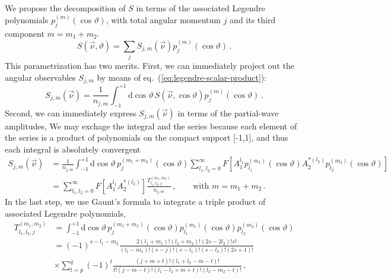 \documentclass[aps,prd,reprint,nofootinbib,preprintnumbers]{revtex4}
\newcommand{\rmdx}[1]{\mbox{d} #1 \,} %
\newcommand{\refeq}[1]{eq.~(\ref{eq:#1})}
\renewcommand{\theta}{\vartheta}
\newcommand{\fred}[1]{{\color{brown!85!black}#1}}
\begin{document}
We propose the decomposition of $S$ in terms of the associated Legendre polynomials $p_{j}^{(m)}(\cos\theta)$, with total angular momentum $j$ and its third component $m=m_1 + m_2$.
\begin{equation}
    S(\vec{\nu}, \theta) = \sum_j S_{j,m}(\vec{\nu}) p_{j}^{(m)}(\cos\theta)\,.
\end{equation}
This parametrization has two merits. First, we can immediately project out the angular observables $S_{j,m}$ by means of \refeq{legendre-scalar-product}:
\begin{equation}
    S_{j,m}(\vec{\nu}) = \frac{1}{n_{j,m}} \int_{-1}^{+1} \rmdx{\cos\theta} S(\vec{\nu},\cos \theta) p_{j}^{(m)}(\cos\theta)\,.
\end{equation}
Second, we can immediately express $S_{j,m}(\vec{\nu})$ in terms of
the partial-wave amplitudes, \fred{We may exchage the integral and the
  series because each element of the series is a product of
  polynomials on the compact support [-1,1], and thus each integral is
  absolutely convergent}
\begin{equation}
    \label{eq:partial-wave-observable-infinite}
    \begin{aligned}
        S_{j,m}(\vec{\nu})
            & = \frac{1}{n_{j,m}} \int_{-1}^{+1} \rmdx{\cos\theta} p_{j}^{(m_1 + m_2)}(\cos\theta) \sum_{l_1,l_2=0}^\infty F\left[A_{1}^{l_1} p_{l_1}^{(m_1)}(\cos\theta) A_{2}^{*(l_2)}p_{l_2}^{(m_2)}(\cos\theta)\right]\\
            & = \sum_{l_1,l_2=0}^\infty F\left[A_{1}^{l_1} A_{2}^{*(l_2)}\right] \frac{T_{l_1,l_2,j}^{(m_1,m_2)}}{n_{j,m}}\,,\qquad\text{with }m = m_1 + m_2\,.
    \end{aligned}
\end{equation}
In the last step, we use Gaunt's formula \cite{Gaunt:1929} to integrate a triple product of associated Legendre polynomials,
\begin{equation}
\begin{aligned}
    T_{l_1,l_2,j}^{(m_1,m_2)}
        & = \int_{-1}^{+1} \rmdx{\cos\theta} p_{j}^{(m_1 + m_2)}(\cos\theta) p_{l_1}^{(m_1)}(\cos\theta) p_{l_2}^{(m_2)}(\cos\theta)\\
        & = (-1)^{s - l_1 - m_2} \frac{2 (l_1 + m_1)! (l_2 + m_2)! (2s - 2 l_2)! s!}{(l_1 - m_1)! (s - j)! (s - l_1)! (s - l_2)! (2s + 1)!}\\
        & \times \sum_{t=p}^q (-1)^t \frac{(j + m + t)!(l_1 + l_2 - m - t)!}{t! (j - m - t)! (l_1 - l_2 + m + t)! (l_2 - m_2 - t)!}\,,
\end{aligned}
\end{equation}
\end{document}
